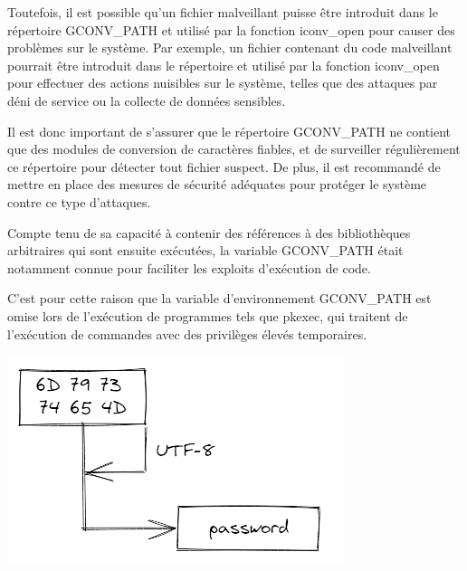 \documentclass[12pt,a4paper]{article}
\begin{document}
\begin{flushleft}
                \item Toutefois, il est possible qu'un fichier malveillant puisse être introduit dans le répertoire GCONV\_PATH et utilisé par la fonction iconv\_open pour causer des problèmes sur le système. Par exemple, un fichier contenant du code malveillant pourrait être introduit dans le répertoire et utilisé par la fonction iconv\_open pour effectuer des actions nuisibles sur le système, telles que des attaques par déni de service ou la collecte de données sensibles.
                \item Il est donc important de s'assurer que le répertoire GCONV\_PATH ne contient que des modules de conversion de caractères fiables, et de surveiller régulièrement ce répertoire pour détecter tout fichier suspect. De plus, il est recommandé de mettre en place des mesures de sécurité adéquates pour protéger le système contre ce type d'attaques.
                \item Compte tenu de sa capacité à contenir des références à des bibliothèques arbitraires qui sont ensuite exécutées, la variable GCONV\_PATH était notamment connue pour faciliter les exploits d’exécution de code. 
                \item C’est pour cette raison que la variable d’environnement GCONV\_PATH est omise lors de l’exécution de programmes tels que pkexec, qui traitent de l’exécution de commandes avec des privilèges élevés temporaires.
                \begin{center}
                    \includegraphics[scale=0.5]{iconv_open}
                \end{center}
                \cite{iconvman:online}
                \cite{gconvpath:online}

\end{flushleft}
\end{document}
